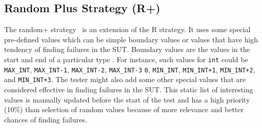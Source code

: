 \documentclass[conference]{IEEEtran}
\begin{document}
\subsection{Random Plus Strategy (R+)}
The random+ strategy~\cite{Leitner2007} is an extension of the R strategy. It uses some special pre-defined values which can be simple boundary values or values that have high tendency of finding failures in the SUT. Boundary values are the values in the start and end of a particular type \cite{Beizer1990}. For instance, such values for \verb+int+ could be \verb+MAX_INT+, \verb+MAX_INT-1+, \verb+MAX_INT-2+, \verb+MAX_INT-3+ \verb+0+, \verb+MIN_INT+, \verb-MIN_INT+1-, \verb-MIN_INT+2-, and \verb-MIN_INT+3-. The tester might also add some other special values that are considered effective in finding failures in the SUT. This static list of interesting values is manually updated before the start of the test and has a high priority (10\%) than selection of random values because of more relevance and better chances of finding failures.
\end{document}
